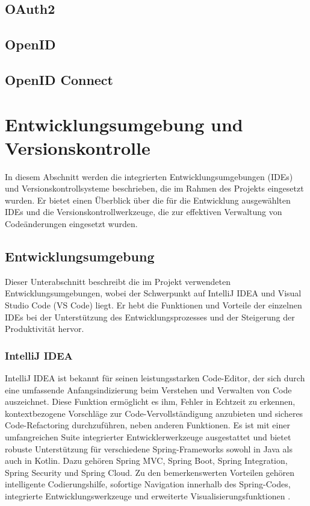 \subsection{OAuth2}
\subsection{OpenID}
\subsection{OpenID Connect}


\section{Entwicklungsumgebung und Versionskontrolle}
In diesem Abschnitt werden die integrierten Entwicklungsumgebungen (IDEs) und Versionskontrollsysteme beschrieben, die im Rahmen des Projekts eingesetzt wurden. Er bietet einen Überblick über die für die Entwicklung ausgewählten IDEs und die Versionskontrollwerkzeuge, die zur effektiven Verwaltung von Codeänderungen eingesetzt wurden.
\subsection{Entwicklungsumgebung}
Dieser Unterabschnitt beschreibt die im Projekt verwendeten Entwicklungsumgebungen, wobei der Schwerpunkt auf IntelliJ IDEA und Visual Studio Code (VS Code) liegt. Er hebt die Funktionen und Vorteile der einzelnen IDEs bei der Unterstützung des Entwicklungsprozesses und der Steigerung der Produktivität hervor.

\subsubsection{IntelliJ IDEA}

IntelliJ IDEA ist bekannt für seinen leistungsstarken Code-Editor, der sich durch eine umfassende Anfangsindizierung beim Verstehen und Verwalten von Code auszeichnet. Diese Funktion ermöglicht es ihm, Fehler in Echtzeit zu erkennen, kontextbezogene Vorschläge zur Code-Vervollständigung anzubieten und sicheres Code-Refactoring durchzuführen, neben anderen Funktionen. Es ist mit einer umfangreichen Suite integrierter Entwicklerwerkzeuge ausgestattet und bietet robuste Unterstützung für verschiedene Spring-Frameworks sowohl in Java als auch in Kotlin. Dazu gehören Spring MVC, Spring Boot, Spring Integration, Spring Security und Spring Cloud. Zu den bemerkenswerten Vorteilen gehören intelligente Codierungshilfe, sofortige Navigation innerhalb des Spring-Codes, integrierte Entwicklungswerkzeuge und erweiterte Visualisierungsfunktionen \cite{Jetbrains:o.J}.


